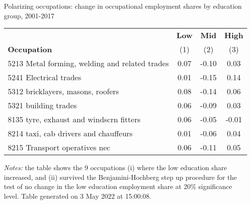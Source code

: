 \begin{center}
\begin{threeparttable}[!h]
\caption{Polarizing occupations: change in occupational employment shares by education group, 2001-2017}
\label{tab:pol_occ}
\begin{tabular}{lccc}
\toprule
\toprule
&\multicolumn{1}{c}{\textbf{Low}}&\multicolumn{1}{c}{\textbf{Mid}}&\multicolumn{1}{c}{\textbf{High}} \\
\textbf{Occupation}&\multicolumn{1}{c}{(1)}&\multicolumn{1}{c}{(2)}&\multicolumn{1}{c}{(3)} \\
\midrule
5213 Metal forming, welding and related trades&        0.07&       -0.10&        0.03\\
5241 Electrical trades&        0.01&       -0.15&        0.14\\
5312 bricklayers, masons, roofers&        0.08&       -0.14&        0.06\\
5321 building trades&        0.06&       -0.09&        0.03\\
8135 tyre, exhaust and windscrn fitters&        0.06&       -0.05&       -0.01\\
8214 taxi, cab drivers and chauffeurs&        0.01&       -0.06&        0.04\\
8215 Transport operatives nec&        0.06&       -0.11&        0.05\\
\bottomrule
\bottomrule
\end{tabular}
\begin{tablenotes}
\item \footnotesize \textit{Notes:} the table shows the 9 occupations (i) where the low education share increased, and (ii) survived the Benjamini-Hochberg step up procedure for the test of no change in the low education employment share at 20\% significance level. Table generated on  3 May 2022 at 15:00:08.
\end{tablenotes}
\end{threeparttable}
\end{center}
